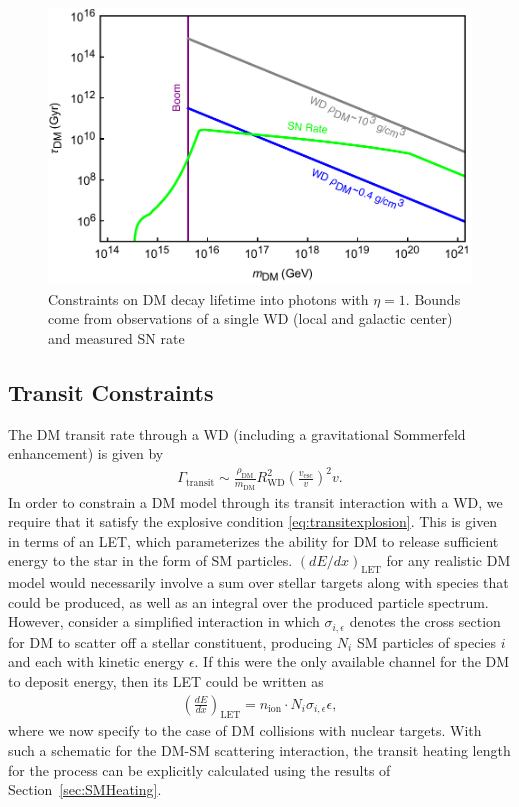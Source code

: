 \documentclass[twocolumn,showpacs,preprintnumbers,amsmath,amssymb,prd]{revtex4}
\def\r{\right)}
\def\l{\left(}
\begin{document}
\begin{figure}
\includegraphics[scale=.45]{decayobservation.pdf}
\caption{Constraints on DM decay lifetime into photons with $\eta =1$. Bounds come from observations of a single WD (local and galactic center) and measured SN rate}
\label{fig:decayclasses}
\end{figure}
 
\subsection{Transit Constraints}
\label{sec:TransitConstraints}

The DM transit rate through a WD (including a gravitational Sommerfeld enhancement) is given by
\begin{align}
\Gamma_\text{transit} \sim \frac{\rho_{\text{DM}}}{m_\text{DM}} R_\text{WD}^2 \l\frac{v_\text{esc}}{v}\r^2 v.
\label{eq:TransitFluxCondition}
\end{align}
In order to constrain a DM model through its transit interaction with a WD, we require that it satisfy the explosive condition \eqref{eq:transitexplosion}. 
This is given in terms of an LET, which parameterizes the ability for DM to release sufficient energy to the star in the form of SM particles.
$(dE/dx)_\text{LET}$ for any realistic DM model would necessarily involve a sum over stellar targets along with species that could be produced, as well as an integral over the produced particle spectrum.
However, consider a simplified interaction in which $\sigma_{i,\epsilon}$ denotes the cross section for DM to scatter off a stellar constituent, producing $N_i$ SM particles of species $i$ and each with kinetic energy $\epsilon$.
If this were the only available channel for the DM to deposit energy, then its LET could be written as
\begin{align}
\label{eq:schematicLET}
  \left( \frac{d E}{d x} \right)_\text{LET} = n_\text{ion} \cdot N_i \sigma_{i,\epsilon} \epsilon,
\end{align}
where we now specify to the case of DM collisions with nuclear targets. 
With such a schematic for the DM-SM scattering interaction, the transit heating length for the process can be explicitly calculated using the results of Section~\ref{sec:SMHeating}.
\end{document}
